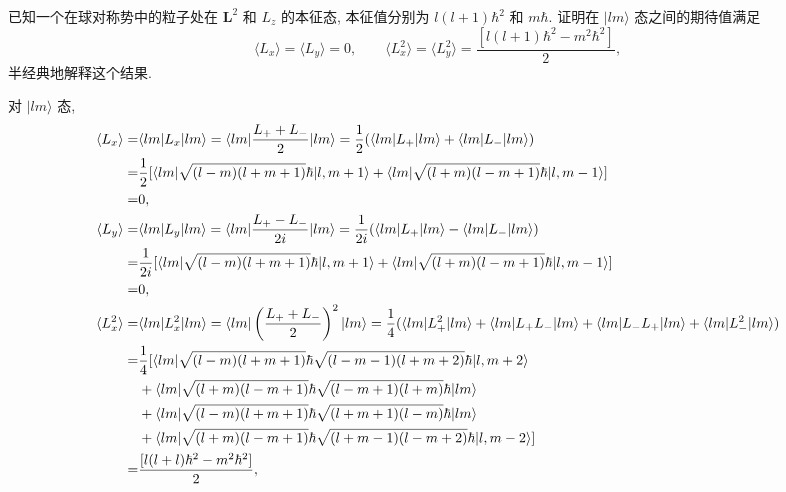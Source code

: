 \documentclass{assignment}
\begin{document}
\begin{prob}[课本习题 3.18]
    已知一个在球对称势中的粒子处在 $\bm{L}^2$ 和 $L_z$ 的本征态, 本征值分别为 $l(l+1)\hbar^2$ 和 $m\hbar$. 证明在 $\lvert lm\rangle$ 态之间的期待值满足
    \[
        \langle L_x\rangle=\langle L_y\rangle=0,\qquad\langle L_x^2\rangle=\langle L_y^2\rangle=\frac{[l(l+1)\hbar^2-m^2\hbar^2]}{2},
    \]
    半经典地解释这个结果.
\end{prob}
\begin{pf}
    对 $\lvert lm\rangle$ 态,
    \begin{align}
        \notag\langle L_x\rangle=&\langle lm\rvert L_x\lvert lm\rangle=\langle lm\rvert\frac{L_++L_-}{2}\lvert lm\rangle=\frac{1}{2}(\langle lm\rvert L_+\lvert lm\rangle+\langle lm\rvert L_-\lvert lm\rangle)\\
        \notag=&\frac{1}{2}[\langle lm\rvert\sqrt{(l-m)(l+m+1)}\hbar\lvert l,m+1\rangle+\langle lm\rvert\sqrt{(l+m)(l-m+1)}\hbar\lvert l,m-1\rangle]\\
        =&0,\\
        \notag\langle L_y\rangle=&\langle lm\rvert L_y\lvert lm\rangle=\langle lm\rvert\frac{L_+-L_-}{2i}\lvert lm\rangle=\frac{1}{2i}(\langle lm\rvert L_+\lvert lm\rangle-\langle lm\rvert L_-\lvert lm\rangle)\\
        \notag=&\frac{1}{2i}[\langle lm\rvert\sqrt{(l-m)(l+m+1)}\hbar\lvert l,m+1\rangle+\langle lm\rvert\sqrt{(l+m)(l-m+1)}\hbar\lvert l,m-1\rangle]\\
        =&0,\\
        \notag\langle L_x^2\rangle=&\langle lm\rvert L_x^2\lvert lm\rangle=\langle lm\rvert\left(\frac{L_++L_-}{2}\right)^2\lvert lm\rangle=\frac{1}{4}(\langle lm\rvert L_+^2\lvert lm\rangle+\langle lm\rvert L_+L_-\lvert lm\rangle+\langle lm\rvert L_-L_+\lvert lm\rangle+\langle lm\rvert L_-^2\lvert lm\rangle)\\
        \notag=&\frac{1}{4}[\langle lm\rvert\sqrt{(l-m)(l+m+1)}\hbar\sqrt{(l-m-1)(l+m+2)}\hbar\lvert l,m+2\rangle\\
        \notag&+\langle lm\rvert\sqrt{(l+m)(l-m+1)}\hbar\sqrt{(l-m+1)(l+m)}\hbar\lvert lm\rangle\\
        \notag&+\langle lm\rvert\sqrt{(l-m)(l+m+1)}\hbar\sqrt{(l+m+1)(l-m)}\hbar\lvert lm\rangle\\
        \notag&+\langle lm\rvert\sqrt{(l+m)(l-m+1)}\hbar\sqrt{(l+m-1)(l-m+2)}\hbar\lvert l,m-2\rangle]\\
        =&\frac{[l(l+l)\hbar^2-m^2\hbar^2]}{2},\\

\end{align}
\end{pf}
\end{document}
